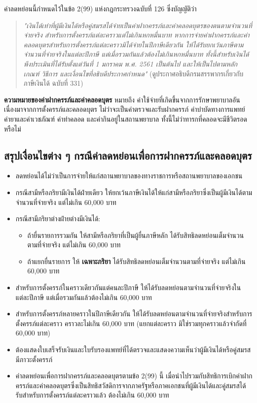 \documentclass[12pt,a4paper]{article}
\newcommand{\hilight}[1]{\textbf{#1}}
\begin{document}
ค่าลดหย่อนนี้กำหนดไว้ในข้อ 2(99) แห่งกฎกระทรวงฉบับที่ 126 ซึ่งบัญญัติว่า

\begin{quote}
\textit{"เงินได้เท่าที่ผู้มีเงินได้หรือคู่สมรสได้จ่ายเป็นค่าฝากครรภ์และค่าคลอดบุตรของตนตามจำนวนที่จ่ายจริง สำหรับการตั้งครรภ์แต่ละคราวแต่ไม่เกินหกหมื่นบาท หากการจ่ายค่าฝากครรภ์และค่าคลอดบุตรสำหรับการตั้งครรภ์แต่ละคราวมิได้จ่ายในปีภาษีเดียวกัน ให้ได้รับยกเว้นภาษีตามจำนวนที่จ่ายจริงในแต่ละปีภาษี แต่เมื่อรวมกันแล้วต้องไม่เกินหกหมื่นบาท ทั้งนี้สำหรับเงินได้พึงประเมินที่ได้รับตั้งแต่วันที่ 1 มกราคม พ.ศ. 2561 เป็นต้นไป และให้เป็นไปตามหลักเกณฑ์ วิธีการ และเงื่อนไขที่อธิบดีประกาศกำหนด"} (ดูประกาศอธิบดีกรมสรรพากรเกี่ยวกับภาษีเงินได้ ฉบับที่ 331)
\end{quote}

\textbf{ความหมายของค่าฝากครรภ์และค่าคลอดบุตร} หมายถึง ค่าใช้จ่ายที่เกิดขึ้นจากการรักษาพยาบาลอันเนื่องมาจากการตั้งครรภ์และคลอดบุตร ไม่ว่าจะเป็นค่าตรวจและรับฝากครรภ์ ค่าบำบัดทางการแพทย์ ค่ายาและค่าเวชภัณฑ์ ค่าทำคลอด และค่ากินอยู่ในสถานพยาบาล ทั้งนี้ไม่ว่าทารกที่คลอดจะมีชีวิตรอดหรือไม่

\subsection*{สรุปเงื่อนไขต่าง ๆ กรณีค่าลดหย่อนเพื่อการฝากครรภ์และคลอดบุตร}

\begin{itemize}
    \item ลดหย่อนได้ไม่ว่าเป็นการจ่ายให้แก่สถานพยาบาลของทางราชการหรือสถานพยาบาลของเอกชน
    \item กรณีสามีหรือภริยามีเงินได้ฝ่ายเดียว ให้ยกเว้นภาษีเงินได้ให้แก่สามีหรือภริยาซึ่งเป็นผู้มีเงินได้ตามจำนวนที่จ่ายจริง แต่ไม่เกิน 60,000 บาท
    \item กรณีสามีภริยาต่างฝ่ายต่างมีเงินได้:
    \begin{itemize}
        \item ถ้ายื่นรายการรวมกัน ให้สามีหรือภริยาที่เป็นผู้ยื่นภาษีหลัก ได้รับสิทธิลดหย่อนเต็มจำนวนตามที่จ่ายจริง แต่ไม่เกิน 60,000 บาท
        \item ถ้าแยกยื่นรายการ ให้ \hilight{เฉพาะภริยา} ได้รับสิทธิลดหย่อนเต็มจำนวนตามที่จ่ายจริง แต่ไม่เกิน 60,000 บาท
    \end{itemize}
    \item สำหรับการตั้งครรภ์ในคราวเดียวกันแต่คนละปีภาษี ให้ได้รับลดหย่อนตามจำนวนที่จ่ายจริงในแต่ละปีภาษี แต่เมื่อรวมกันแล้วต้องไม่เกิน 60,000 บาท
    \item สำหรับการตั้งครรภ์หลายคราวในปีภาษีเดียวกัน ให้ได้รับลดหย่อนตามจำนวนที่จ่ายจริงสำหรับการตั้งครรภ์แต่ละคราว คราวละไม่เกิน 60,000 บาท (แยกแต่ละคราว มิใช่รวมทุกคราวแล้วจำกัดที่ 60,000 บาท)
    \item ต้องแสดงใบเสร็จรับเงินและใบรับรองแพทย์ที่ได้ตรวจและแสดงความเห็นว่าผู้มีเงินได้หรือคู่สมรสมีภาวะตั้งครรภ์
    \item ค่าลดหย่อนเพื่อการฝากครรภ์และคลอดบุตรตามข้อ 2(99) นี้ เมื่อนำไปรวมกับสิทธิการเบิกค่าฝากครรภ์และค่าคลอดบุตรซึ่งเป็นสิทธิสวัสดิการจากภาครัฐหรือภาคเอกชนที่ผู้มีเงินได้และคู่สมรสได้รับสำหรับการตั้งครรภ์แต่ละคราวแล้ว ต้องไม่เกิน 60,000 บาท
\end{itemize}
\end{document}
